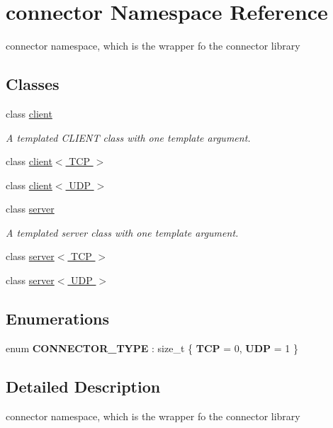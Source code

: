 \hypertarget{namespaceconnector}{}\section{connector Namespace Reference}
\label{namespaceconnector}


connector namespace, which is the wrapper fo the connector library  


\subsection*{Classes}
\begin{DoxyCompactItemize}
\item 
class \hyperlink{classconnector_1_1client}{client}
\begin{DoxyCompactList}\small\item\em A templated C\+L\+I\+E\+NT class with one template argument. \end{DoxyCompactList}\item 
class \hyperlink{classconnector_1_1client_3_01TCP_01_4}{client$<$ T\+C\+P $>$}
\item 
class \hyperlink{classconnector_1_1client_3_01UDP_01_4}{client$<$ U\+D\+P $>$}
\item 
class \hyperlink{classconnector_1_1server}{server}
\begin{DoxyCompactList}\small\item\em A templated server class with one template argument. \end{DoxyCompactList}\item 
class \hyperlink{classconnector_1_1server_3_01TCP_01_4}{server$<$ T\+C\+P $>$}
\item 
class \hyperlink{classconnector_1_1server_3_01UDP_01_4}{server$<$ U\+D\+P $>$}
\end{DoxyCompactItemize}
\subsection*{Enumerations}
\begin{DoxyCompactItemize}
\item 
\mbox{\label{namespaceconnector_ad44d80cfdddb0ea443a699c5bf6722aa}} 
enum {\bfseries C\+O\+N\+N\+E\+C\+T\+O\+R\+\_\+\+T\+Y\+PE} \+: size\+\_\+t \{ {\bfseries T\+CP} = 0, 
{\bfseries U\+DP} = 1
 \}
\end{DoxyCompactItemize}


\subsection{Detailed Description}
connector namespace, which is the wrapper fo the connector library 


